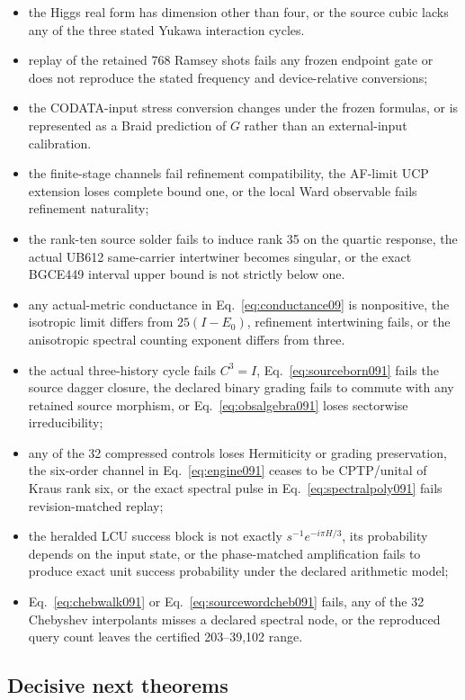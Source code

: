 \documentclass[11pt]{article}
\theoremstyle{definition}
\theoremstyle{remark}
\begin{document}
\begin{itemize}
\item the Higgs real form has dimension other than four, or the source cubic lacks any of the three stated Yukawa interaction cycles.
\item replay of the retained 768 Ramsey shots fails any frozen endpoint gate or does not reproduce the stated frequency and device-relative conversions;
\item the CODATA-input stress conversion changes under the frozen formulas, or is represented as a Braid prediction of $G$ rather than an external-input calibration.
\item the finite-stage channels fail refinement compatibility, the AF-limit UCP extension loses complete bound one, or the local Ward observable fails refinement naturality;
\item the rank-ten source solder fails to induce rank 35 on the quartic response, the actual UB612 same-carrier intertwiner becomes singular, or the exact BGCE449 interval upper bound is not strictly below one.
\item any actual-metric conductance in Eq.~\eqref{eq:conductance09} is nonpositive, the isotropic limit differs from $25(I-E_0)$, refinement intertwining fails, or the anisotropic spectral counting exponent differs from three.
\item the actual three-history cycle fails $C^3=I$, Eq.~\eqref{eq:sourceborn091} fails the source dagger closure, the declared binary grading fails to commute with any retained source morphism, or Eq.~\eqref{eq:obsalgebra091} loses sectorwise irreducibility;
\item any of the 32 compressed controls loses Hermiticity or grading preservation, the six-order channel in Eq.~\eqref{eq:engine091} ceases to be CPTP/unital of Kraus rank six, or the exact spectral pulse in Eq.~\eqref{eq:spectralpoly091} fails revision-matched replay;
\item the heralded LCU success block is not exactly $s^{-1}e^{-i\pi H/3}$, its probability depends on the input state, or the phase-matched amplification fails to produce exact unit success probability under the declared arithmetic model;
\item Eq.~\eqref{eq:chebwalk091} or Eq.~\eqref{eq:sourcewordcheb091} fails, any of the 32 Chebyshev interpolants misses a declared spectral node, or the reproduced query count leaves the certified 203--39,102 range.
\end{itemize}

\subsection{Decisive next theorems}
\end{document}
